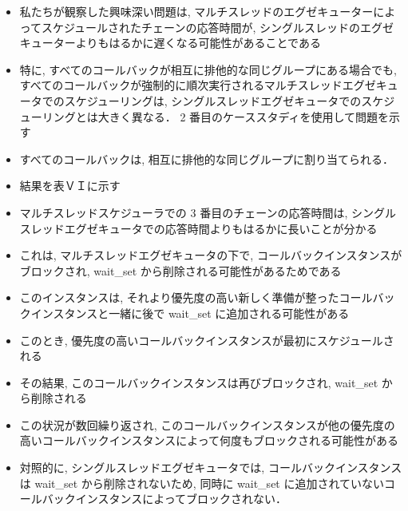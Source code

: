 \begin{frame}{}
    \begin{itemize}
        \item 私たちが観察した興味深い問題は, マルチスレッドのエグゼキューターによってスケジュールされたチェーンの応答時間が, シングルスレッドのエグゼキューターよりもはるかに遅くなる可能性があることである
\item 特に, すべてのコールバックが相互に排他的な同じグループにある場合でも, すべてのコールバックが強制的に順次実行されるマルチスレッドエグゼキュータでのスケジューリングは, シングルスレッドエグゼキュータでのスケジューリングとは大きく異なる． 2 番目のケーススタディを使用して問題を示す
\item すべてのコールバックは, 相互に排他的な同じグループに割り当てられる．
    \end{itemize}
\end{frame}

\begin{frame}{}
    \begin{itemize}
        \item 結果を表ＶＩに示す
\item マルチスレッドスケジューラでの 3 番目のチェーンの応答時間は, シングルスレッドエグゼキュータでの応答時間よりもはるかに長いことが分かる
\item これは, マルチスレッドエグゼキュータの下で, コールバックインスタンスがブロックされ, wait\_set から削除される可能性があるためである
\item このインスタンスは, それより優先度の高い新しく準備が整ったコールバックインスタンスと一緒に後で wait\_set に追加される可能性がある
\item このとき, 優先度の高いコールバックインスタンスが最初にスケジュールされる
\item その結果, このコールバックインスタンスは再びブロックされ, wait\_set から削除される
\item この状況が数回繰り返され, このコールバックインスタンスが他の優先度の高いコールバックインスタンスによって何度もブロックされる可能性がある
\item 対照的に, シングルスレッドエグゼキュータでは, コールバックインスタンスは wait\_set から削除されないため, 同時に wait\_set に追加されていないコールバックインスタンスによってブロックされない．
    \end{itemize}
\end{frame}

